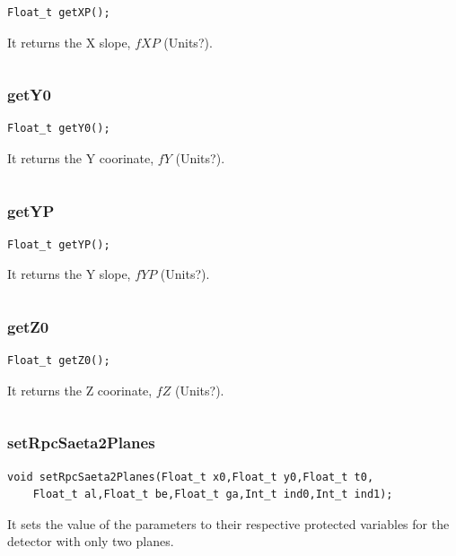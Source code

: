 \documentclass[a4paper]{book}
\begin{document}
\begin{lstlisting}
Float_t getXP();
\end{lstlisting}

It returns the X slope, $fXP$ (Units?).

\[\]

\subsubsection{getY0}

\begin{lstlisting}
Float_t getY0();
\end{lstlisting}

It returns the Y coorinate, $fY$ (Units?).

\[\]

\subsubsection{getYP}

\begin{lstlisting}
Float_t getYP();
\end{lstlisting}

It returns the Y slope, $fYP$ (Units?).

\[\]

\subsubsection{getZ0}

\begin{lstlisting}
Float_t getZ0();
\end{lstlisting}

It returns the Z coorinate, $fZ$ (Units?).

\[\]

\subsubsection{setRpcSaeta2Planes}

\begin{lstlisting}
void setRpcSaeta2Planes(Float_t x0,Float_t y0,Float_t t0,
	Float_t al,Float_t be,Float_t ga,Int_t ind0,Int_t ind1);
\end{lstlisting}

It sets the value of the parameters to their respective protected variables for the detector with only two planes.
\end{document}
